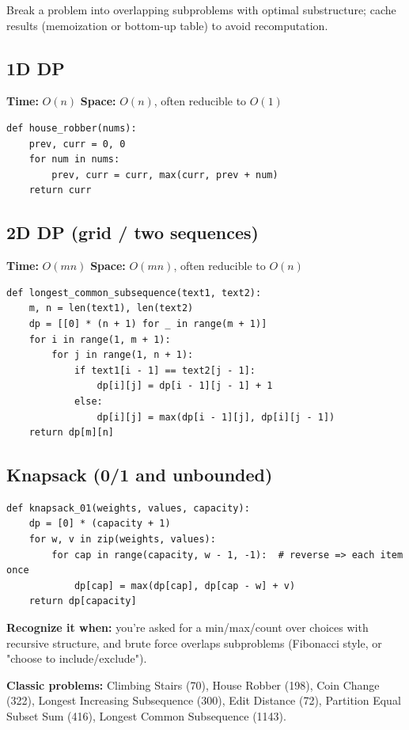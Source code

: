 \documentclass[11pt]{article}
\newcommand{\complexity}[2]{\textbf{Time:} #1 \quad \textbf{Space:} #2}
\begin{document}
Break a problem into overlapping subproblems with optimal substructure;
cache results (memoization or bottom-up table) to avoid recomputation.

\subsection{1D DP}
\complexity{$O(n)$}{$O(n)$, often reducible to $O(1)$}

\begin{lstlisting}
def house_robber(nums):
    prev, curr = 0, 0
    for num in nums:
        prev, curr = curr, max(curr, prev + num)
    return curr
\end{lstlisting}

\subsection{2D DP (grid / two sequences)}
\complexity{$O(mn)$}{$O(mn)$, often reducible to $O(n)$}

\begin{lstlisting}
def longest_common_subsequence(text1, text2):
    m, n = len(text1), len(text2)
    dp = [[0] * (n + 1) for _ in range(m + 1)]
    for i in range(1, m + 1):
        for j in range(1, n + 1):
            if text1[i - 1] == text2[j - 1]:
                dp[i][j] = dp[i - 1][j - 1] + 1
            else:
                dp[i][j] = max(dp[i - 1][j], dp[i][j - 1])
    return dp[m][n]
\end{lstlisting}

\subsection{Knapsack (0/1 and unbounded)}

\begin{lstlisting}
def knapsack_01(weights, values, capacity):
    dp = [0] * (capacity + 1)
    for w, v in zip(weights, values):
        for cap in range(capacity, w - 1, -1):  # reverse => each item once
            dp[cap] = max(dp[cap], dp[cap - w] + v)
    return dp[capacity]
\end{lstlisting}

\textbf{Recognize it when:} you're asked for a min/max/count over choices
with recursive structure, and brute force overlaps subproblems (Fibonacci
style, or "choose to include/exclude").

\textbf{Classic problems:} Climbing Stairs (70), House Robber (198),
Coin Change (322), Longest Increasing Subsequence (300), Edit Distance
(72), Partition Equal Subset Sum (416), Longest Common Subsequence (1143).
\end{document}

